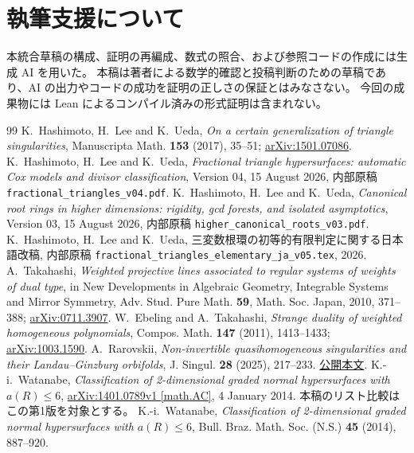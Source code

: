 \documentclass[11pt,a4paper]{ltjsarticle}
\numberwithin{equation}{section}
\theoremstyle{definition}
\begin{document}
\section*{執筆支援について}
本統合草稿の構成、証明の再編成、数式の照合、および参照コードの作成には生成 AI を用いた。
本稿は著者による数学的確認と投稿判断のための草稿であり、AI の出力やコードの成功を証明の正しさの保証とはみなさない。
今回の成果物には Lean によるコンパイル済みの形式証明は含まれない。

\begin{thebibliography}{99}
K.~Hashimoto, H.~Lee and K.~Ueda,
\emph{On a certain generalization of triangle singularities},
Manuscripta Math. \textbf{153} (2017), 35--51;
\href{https://arxiv.org/abs/1501.07086}{arXiv:1501.07086}.
K.~Hashimoto, H.~Lee and K.~Ueda,
\emph{Fractional triangle hypersurfaces: automatic Cox models and divisor classification},
Version 04, 15 August 2026, 内部原稿 \texttt{fractional\_triangles\_v04.pdf}.
K.~Hashimoto, H.~Lee and K.~Ueda,
\emph{Canonical root rings in higher dimensions: rigidity, gcd forests, and isolated asymptotics},
Version 03, 15 August 2026, 内部原稿 \texttt{higher\_canonical\_roots\_v03.pdf}.
K.~Hashimoto, H.~Lee and K.~Ueda,
三変数根環の初等的有限判定に関する日本語改稿,
内部原稿 \texttt{fractional\_triangles\_elementary\_ja\_v05.tex}, 2026.
A.~Takahashi,
\emph{Weighted projective lines associated to regular systems of weights of dual type},
in New Developments in Algebraic Geometry, Integrable Systems and Mirror Symmetry,
Adv. Stud. Pure Math. \textbf{59}, Math. Soc. Japan, 2010, 371--388;
\href{https://arxiv.org/abs/0711.3907}{arXiv:0711.3907}.
W.~Ebeling and A.~Takahashi,
\emph{Strange duality of weighted homogeneous polynomials},
Compos. Math. \textbf{147} (2011), 1413--1433;
\href{https://arxiv.org/abs/1003.1590}{arXiv:1003.1590}.
A.~Rarovskii,
\emph{Non-invertible quasihomogeneous singularities and their Landau--Ginzburg orbifolds},
J. Singul. \textbf{28} (2025), 217--233.
\href{https://www.journalofsing.org/volume28/rarovskii.pdf}{公開本文}.
K.-i.~Watanabe,
\emph{Classification of 2-dimensional graded normal hypersurfaces with $a(R)\le6$},
\href{https://arxiv.org/abs/1401.0789v1}{arXiv:1401.0789v1 [math.AC]}, 4 January 2014.
本稿のリスト比較はこの第1版を対象とする。
K.-i.~Watanabe,
\emph{Classification of 2-dimensional graded normal hypersurfaces with $a(R)\le6$},
Bull. Braz. Math. Soc. (N.S.) \textbf{45} (2014), 887--920.

\end{thebibliography}
\end{document}
